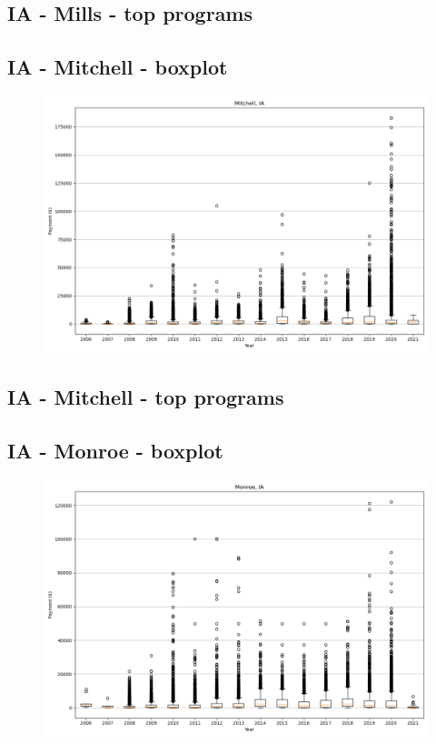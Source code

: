 \subsection*{IA - Mills - top programs}

\newpage
\subsection*{IA - Mitchell - boxplot}
\begin{figure}[h]
\centering
\includegraphics[width=7in]{../output/boxplots/counties/Mitchell-IA_boxplot.png}
\end{figure}


\subsection*{IA - Mitchell - top programs}

\newpage
\subsection*{IA - Monroe - boxplot}
\begin{figure}[h]
\centering
\includegraphics[width=7in]{../output/boxplots/counties/Monroe-IA_boxplot.png}
\end{figure}


